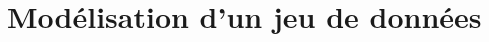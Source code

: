 \documentclass{presentation_template}
\begin{document}



\section{Modélisation d'un jeu de données}
\end{document}
